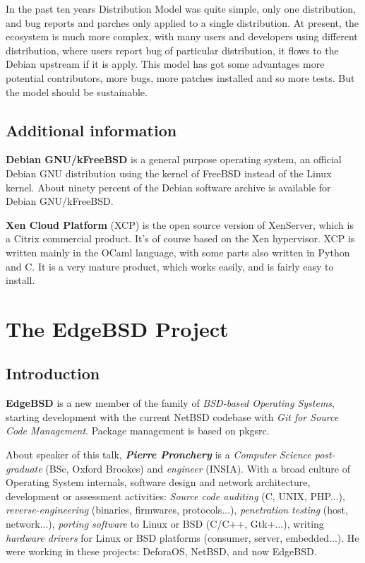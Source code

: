\documentclass[11pt]{article}
\begin{document}
In the past ten years Distribution Model was quite simple, only one distribution, and bug reports and parches only applied to a single distribution. At present, the ecosystem is much more complex, with many users and developers using different distribution, where users report bug of particular distribution, it flows to the Debian upstream if it is apply. This model has got some advantages more potential contributors, more bugs, more patches installed and so more tests. But the model should be sustainable.

\subsection{Additional information}
\textbf{Debian GNU/kFreeBSD} is a general purpose operating system, an official Debian GNU distribution using the kernel of FreeBSD instead of the Linux kernel. About ninety percent of the Debian software archive is available for Debian GNU/kFreeBSD.

\textbf{Xen Cloud Platform }(XCP) is the open source version of XenServer, which is a Citrix commercial product. It's of course based on the Xen hypervisor. XCP is written mainly in the OCaml language, with some parts also written in Python and C. It is a very mature product, which works easily, and is fairly easy to install. 

\newpage

\section{The EdgeBSD Project}

\subsection{Introduction}
\textbf{EdgeBSD} is a new member of the family of \emph{BSD-based Operating Systems}, starting development with the current NetBSD codebase with \emph{Git for Source Code Management}. Package management is based on pkgsrc.

About speaker of this talk, \emph{\textbf{Pierre Pronchery}} is a \emph{Computer Science post-graduate} (BSc, Oxford Brookes) and \emph{engineer} (INSIA). With a broad culture of Operating System internals, software design and network architecture, development or assessment activities: \emph{Source code auditing }(C, UNIX, PHP...), \emph{reverse-engineering} (binaries, firmwares, protocols...), \emph{penetration testing} (host, network...), \emph{porting software} to Linux or BSD (C/C++, Gtk+...), writing \emph{hardware drivers} for Linux or BSD platforms (consumer, server, embedded...). He were working in these projects: DeforaOS, NetBSD, and now EdgeBSD.
\end{document}
